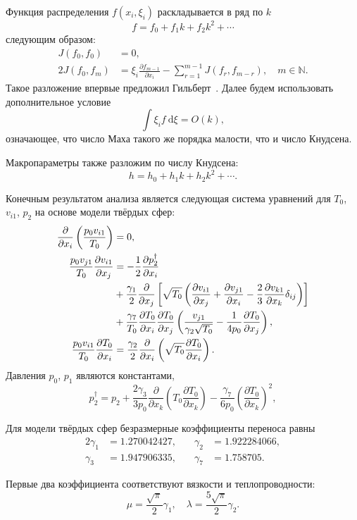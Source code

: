 \documentclass[english,russian,a4paper,12pt]{article}
\newcommand{\dd}{\:\mathrm{d}}
\newcommand{\pder}[2][]{\frac{\partial#1}{\partial#2}}
\begin{document}
Функция распределения \(f(x_i,\xi_i)\) раскладывается в ряд по \(k\)
\[ f = f_0 + f_1k + f_2k^2 + \cdots \]
следующим образом:
\begin{align*}
	J(f_0,f_0) &= 0, \\
	2J(f_0,f_m) &= \xi_i\pder[f_{m-1}]{x_i} - \sum\limits_{r=1}^{m-1}J(f_r,f_{m-r}), \quad m \in \mathbb{N}.
\end{align*}
Такое разложение впервые предложил Гильберт~\cite{Hilbert1912}. Далее будем использовать дополнительное условие
\[ \int\xi_if\dd\xi = O(k), \]
означающее, что число Маха такого же порядка малости, что и число Кнудсена.

Макропараметры также разложим по числу Кнудсена:
\[ h = h_0 + h_1k + h_2k^2 + \cdots. \]

Конечным результатом анализа является следующая система уравнений для \(T_0\), \(v_{i1}\), \(p_2\)
на основе модели твёрдых сфер:
\begin{align}
	\pder{x_i}\left(\frac{p_0v_{i1}}{T_0}\right) &= 0, \label{eq:asymptotic1} \\
	\frac{p_0v_{j1}}{T_0}\pder[v_{i1}]{x_j} &= -\frac12\pder[p_2^\dag]{x_i} \notag\\
		&+ \frac{\gamma_1}2\pder{x_j}\left[\sqrt{T_0}\left(
			\pder[v_{i1}]{x_j}+\pder[v_{j1}]{x_i}-\frac23\pder[v_{k1}]{x_k}\delta_{ij}\right
		)\right] \notag\\
		&+ \frac{\gamma_7}{T_0}\pder[T_0]{x_i}\pder[T_0]{x_j}\left(
			\frac{v_{j1}}{\gamma_2\sqrt{T_0}} - \frac1{4p_0}\pder[T_0]{x_j}
		\right), \label{eq:asymptotic2} \\
	\frac{p_0v_{i1}}{T_0}\pder[T_0]{x_i} &= \frac{\gamma_2}2\pder{x_i}\left(
		\sqrt{T_0}\pder[T_0]{x_i}
	\right). \label{eq:asymptotic3}
\end{align}
Давления \(p_0\), \(p_1\) являются константами,
\[ 
	p_2^\dag = p_2 + 
		\frac{2\gamma_3}{3p_0}\pder{x_k}\left(T_0\pder[T_0]{x_k}\right) -
		\frac{\gamma_7}{6p_0}\left(\pder[T_0]{x_k}\right)^2,
\]

Для модели твёрдых сфер безразмерные коэффициенты переноса равны
\begin{alignat*}{2}
	\gamma_1 &= 1.270042427, &\quad \gamma_2 &= 1.922284066, \\
	\gamma_3 &= 1.947906335, &\quad \gamma_7 &= 1.758705.
\end{alignat*}

Первые два коэффициента соответствуют вязкости и теплопроводности:
\[ \mu = \frac{\sqrt\pi}2\gamma_1, \quad \lambda = \frac{5\sqrt\pi}2\gamma_2. \]
\end{document}
